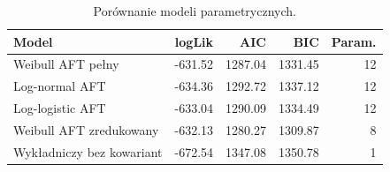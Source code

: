 \begin{table}[htbp]
\centering
\caption{Porównanie modeli parametrycznych.}
\label{tab:param-compare}
\small
\setlength{\tabcolsep}{2.4pt}
\begin{tabular*}{.98\linewidth}{@{\extracolsep{\fill}}lrrrr}
\toprule
Model & logLik & AIC & BIC & Param. \\
\midrule
Weibull AFT pełny & -631.52 & 1287.04 & 1331.45 & 12 \\
Log-normal AFT & -634.36 & 1292.72 & 1337.12 & 12 \\
Log-logistic AFT & -633.04 & 1290.09 & 1334.49 & 12 \\
Weibull AFT zredukowany & -632.13 & 1280.27 & 1309.87 & 8 \\
Wykładniczy bez kowariant & -672.54 & 1347.08 & 1350.78 & 1 \\
\bottomrule
\end{tabular*}
\end{table}
